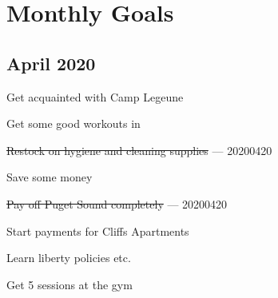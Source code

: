 \chapter{Monthly Goals}

\section{April 2020}

\begin{todolist}
\item Get acquainted with Camp Legeune
\item Get some good workouts in
\item \sout{Restock on hygiene and cleaning supplies} --- 20200420
\item Save some money
\item \sout{Pay off Puget Sound completely} --- 20200420
\item Start payments for Cliffs Apartments
\item Learn liberty policies etc.
\item Get 5 sessions at the gym
\end{todolist}
